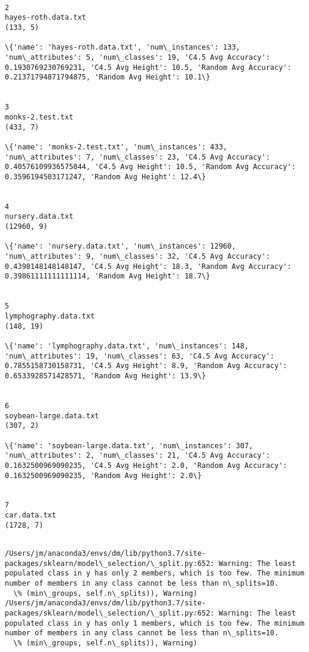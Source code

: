 \documentclass[11pt]{article}
\begin{document}
    \begin{Verbatim}[commandchars=\\\{\}]

2
hayes-roth.data.txt
(133, 5)

\{'name': 'hayes-roth.data.txt', 'num\_instances': 133, 'num\_attributes': 5, 'num\_classes': 19, 'C4.5 Avg Accuracy': 0.1930769230769231, 'C4.5 Avg Height': 10.5, 'Random Avg Accuracy': 0.21371794871794875, 'Random Avg Height': 10.1\}


3
monks-2.test.txt
(433, 7)

\{'name': 'monks-2.test.txt', 'num\_instances': 433, 'num\_attributes': 7, 'num\_classes': 23, 'C4.5 Avg Accuracy': 0.40576109936575044, 'C4.5 Avg Height': 10.5, 'Random Avg Accuracy': 0.3596194503171247, 'Random Avg Height': 12.4\}


4
nursery.data.txt
(12960, 9)

\{'name': 'nursery.data.txt', 'num\_instances': 12960, 'num\_attributes': 9, 'num\_classes': 32, 'C4.5 Avg Accuracy': 0.4398148148148147, 'C4.5 Avg Height': 18.3, 'Random Avg Accuracy': 0.39861111111111114, 'Random Avg Height': 18.7\}


5
lymphography.data.txt
(148, 19)

\{'name': 'lymphography.data.txt', 'num\_instances': 148, 'num\_attributes': 19, 'num\_classes': 63, 'C4.5 Avg Accuracy': 0.7855158730158731, 'C4.5 Avg Height': 8.9, 'Random Avg Accuracy': 0.6533928571428571, 'Random Avg Height': 13.9\}


6
soybean-large.data.txt
(307, 2)

\{'name': 'soybean-large.data.txt', 'num\_instances': 307, 'num\_attributes': 2, 'num\_classes': 21, 'C4.5 Avg Accuracy': 0.1632500969090235, 'C4.5 Avg Height': 2.0, 'Random Avg Accuracy': 0.1632500969090235, 'Random Avg Height': 2.0\}


7
car.data.txt
(1728, 7)


    \end{Verbatim}

    \begin{Verbatim}[commandchars=\\\{\}]
/Users/jm/anaconda3/envs/dm/lib/python3.7/site-packages/sklearn/model\_selection/\_split.py:652: Warning: The least populated class in y has only 2 members, which is too few. The minimum number of members in any class cannot be less than n\_splits=10.
  \% (min\_groups, self.n\_splits)), Warning)
/Users/jm/anaconda3/envs/dm/lib/python3.7/site-packages/sklearn/model\_selection/\_split.py:652: Warning: The least populated class in y has only 1 members, which is too few. The minimum number of members in any class cannot be less than n\_splits=10.
  \% (min\_groups, self.n\_splits)), Warning)

    \end{Verbatim}
\end{document}
